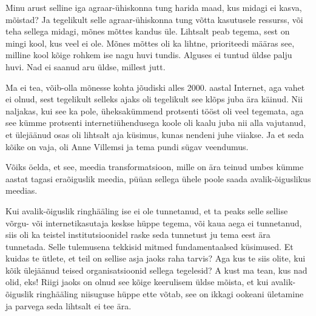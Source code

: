 
Minu arust selline iga agraar-ühiskonna tung harida maad, kus midagi ei kasva, 
mõistad? Ja tegelikult selle agraar-ühiskonna tung võtta kasutusele ressurss, 
või teha sellega midagi, mõnes mõttes kandus üle. Lihtsalt peab tegema, sest  on 
 mingi kool, kus veel ei ole. Mõnes mõttes oli ka lihtne, prioriteedi määras 
see, milline kool kõige rohkem ise nagu huvi tundis. Alguses ei tuntud üldse 
palju huvi. Nad ei saanud aru üldse, millest jutt.


Ma ei tea, võib-olla mõnesse kohta jõudiski alles 2000. aastal Internet, aga 
vahet ei olnud, sest tegelikult selleks ajaks oli tegelikult see klõps juba 
ära käinud. Nii naljakas, kui see ka pole, üheksakümmend protsenti tööst oli 
veel tegemata, aga see kümme protsenti internetiühendusega koole oli kaalu juba 
nii alla vajutanud, et  ülejäänud osas oli lihtsalt aja küsimus, kunas nendeni 
juhe viiakse. Ja et seda kõike on vaja, oli Anne Villemsi ja tema pundi sügav veendumus. 


Võiks öelda, et see, meedia transformatsioon, mille on ära teinud umbes kümme 
aastat tagasi eraõiguslik meedia, püüan sellega ühele poole saada 
avalik-õiguslikus meedias.


Kui avalik-õiguslik ringhääling ise ei ole 
tunnetanud, et ta peaks selle  sellise
võrgu- või internetikasutaja keskse hüppe tegema, või  kaua aega ei tunnetanud, 
siis oli ka teistel institutsioonidel  raske seda tunnetust ju tema eest ära 
tunnetada. Selle tulemusena  tekkisid mitmed fundamentaalsed küsimused. Et 
kuidas te ütlete, et teil on sellise asja jaoks raha tarvis? Aga kus te siis 
olite, kui kõik ülejäänud teised organisatsioonid sellega tegelesid? A kust ma 
tean, kus nad olid, eks! Riigi jaoks on olnud see kõige keerulisem  üldse 
mõista, et kui avalik-õiguslik ringhääling niisuguse hüppe ette võtab, see on 
ikkagi ookeani ületamine ja parvega seda lihtsalt ei tee ära.


